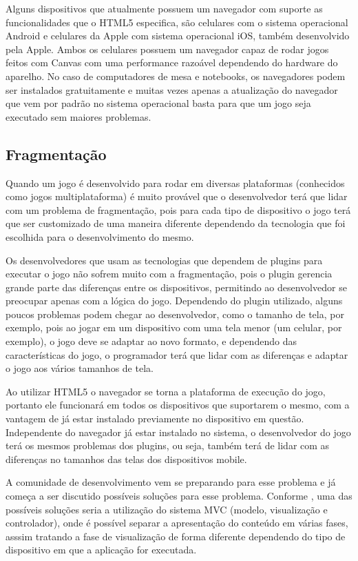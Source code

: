 Alguns dispositivos que atualmente possuem um navegador com suporte as
funcionalidades que o HTML5 especifica, são celulares com o sistema
operacional Android e celulares da Apple com sistema operacional iOS,
também desenvolvido pela Apple.
Ambos os celulares possuem um navegador capaz de rodar jogos feitos
com Canvas com uma performance razoável dependendo do hardware do
aparelho. No caso de computadores de mesa e notebooks, os navegadores
podem ser instalados gratuitamente e muitas vezes apenas a atualização
do navegador que vem por padrão no sistema operacional basta para que
um jogo seja executado sem maiores problemas.

\subsection{Fragmentação}

Quando um jogo é desenvolvido para rodar em diversas plataformas
(conhecidos como jogos multiplataforma) é muito provável que o
desenvolvedor terá que lidar com um problema de fragmentação, pois
para cada tipo de dispositivo o jogo terá que ser customizado de uma
maneira diferente dependendo da tecnologia que foi escolhida para o
desenvolvimento do mesmo.

Os desenvolvedores que usam as tecnologias que dependem de plugins para executar o
jogo não sofrem muito com a fragmentação, pois o plugin gerencia
grande parte das diferenças entre os dispositivos, permitindo ao
desenvolvedor se preocupar apenas com a lógica do jogo. Dependendo do
plugin utilizado, alguns poucos problemas podem chegar ao
desenvolvedor, como o tamanho de tela, por exemplo, pois ao jogar em
um dispositivo com uma tela menor (um celular, por exemplo), o jogo
deve se adaptar ao novo formato, e dependendo das características do jogo, o
programador terá que lidar com as diferenças e adaptar o jogo aos
vários tamanhos de tela.

Ao utilizar HTML5 o navegador se torna a plataforma de execução do
jogo, portanto ele funcionará em todos os dispositivos que
suportarem o mesmo, com a vantagem de já estar instalado previamente
no dispositivo em questão.
Independente do navegador já estar instalado no sistema, o
desenvolvedor do jogo terá os mesmos problemas dos plugins, ou seja,
também terá de lidar com as diferenças no tamanhos das telas dos
dispositivos mobile.

A comunidade de desenvolvimento vem se preparando para esse problema e
já começa a ser discutido possíveis soluções para esse problema.
Conforme , uma das possíveis soluções seria a
utilização do sistema MVC (modelo, visualização e controlador), onde é
possível separar a apresentação do conteúdo em várias fases, asssim
tratando a fase de visualização de forma diferente dependendo do tipo
de dispositivo em que a aplicação for executada.

